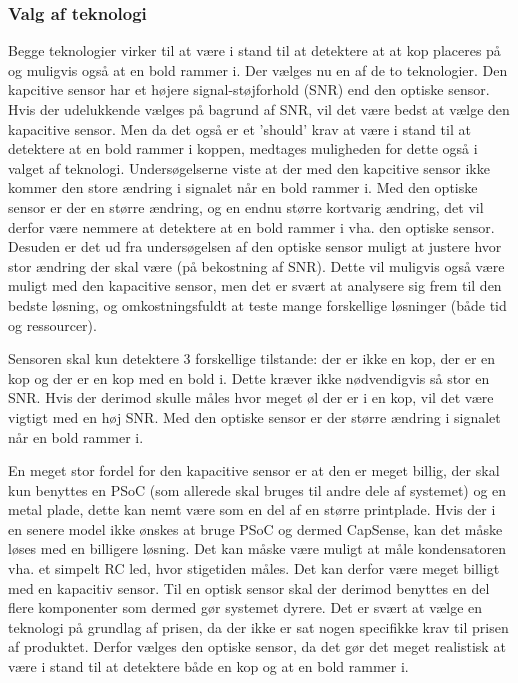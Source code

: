 \documentclass[HardwareDesign/HardwareDesign_main.tex]{subfiles}
\begin{document}
\subsubsection{Valg af teknologi}
Begge teknologier virker til at være i stand til at detektere at at kop placeres på og muligvis også at en bold rammer i.
Der vælges nu en af de to teknologier. Den kapcitive sensor har et højere signal-støjforhold (SNR) end den optiske sensor. Hvis der udelukkende vælges på bagrund af SNR, vil det være bedst at vælge den kapacitive sensor. Men da det også er et 'should' krav at være i stand til at detektere at en bold rammer i koppen, medtages muligheden for dette også i valget af teknologi. Undersøgelserne viste at der med den kapcitive sensor ikke kommer den store ændring i signalet når en bold rammer i. Med den optiske sensor er der en større ændring, og en endnu større kortvarig ændring, det vil derfor være nemmere at detektere at en bold rammer i vha. den optiske sensor. Desuden er det ud fra undersøgelsen af den optiske sensor muligt at justere hvor stor ændring der skal være (på bekostning af SNR). Dette vil muligvis også være muligt med den kapacitive sensor, men det er svært at analysere sig frem til den bedste løsning, og omkostningsfuldt at teste mange forskellige løsninger (både tid og ressourcer). 

Sensoren skal kun detektere 3 forskellige tilstande: der er ikke en kop, der er en kop og der er en kop med en bold i. Dette kræver ikke nødvendigvis så stor en SNR. Hvis der derimod skulle måles hvor meget øl der er i en kop, vil det være vigtigt med en høj SNR. Med den optiske sensor er der større ændring i signalet når en bold rammer i.

En meget stor fordel for den kapacitive sensor er at den er meget billig, der skal kun benyttes en PSoC (som allerede skal bruges til andre dele af systemet) og en metal plade, dette kan nemt være som en del af en større printplade. Hvis der i en senere model ikke ønskes at bruge PSoC og dermed CapSense, kan det måske løses med en billigere løsning. Det kan måske være muligt at måle kondensatoren vha. et simpelt RC led, hvor stigetiden måles. Det kan derfor være meget billigt med en kapacitiv sensor. Til en optisk sensor skal der derimod benyttes en del flere komponenter som dermed gør systemet dyrere.
Det er svært at vælge en teknologi på grundlag af prisen, da der ikke er sat nogen specifikke krav til prisen af produktet. Derfor vælges den optiske sensor, da det gør det meget realistisk at være i stand til at detektere både en kop og at en bold rammer i.
\end{document}
